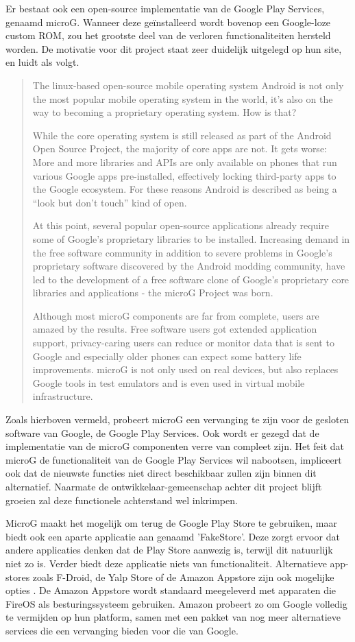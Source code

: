 Er bestaat ook een open-source implementatie van de Google Play Services, genaamd microG. Wanneer deze geïnstalleerd wordt bovenop een Google-loze custom ROM, zou het grootste deel van de verloren functionaliteiten hersteld worden. De motivatie voor dit project staat zeer duidelijk uitgelegd op hun site, en luidt als volgt. \blockcquote{microg}{
    The linux-based open-source mobile operating system Android is not only the most popular mobile operating system in the world, it’s also on the way to becoming a proprietary operating system. How is that?
    
    While the core operating system is still released as part of the Android Open Source Project, the majority of core apps are not. It gets worse: More and more libraries and APIs are only available on phones that run various Google apps pre-installed, effectively locking third-party apps to the Google ecosystem. For these reasons Android is described as being a “look but don’t touch” kind of open.
    
    At this point, several popular open-source applications already require some of Google’s proprietary libraries to be installed. Increasing demand in the free software community in addition to severe problems in Google’s proprietary software discovered by the Android modding community, have led to the development of a free software clone of Google’s proprietary core libraries and applications - the microG Project was born.
    
    Although most microG components are far from complete, users are amazed by the results. Free software users got extended application support, privacy-caring users can reduce or monitor data that is sent to Google and especially older phones can expect some battery life improvements. microG is not only used on real devices, but also replaces Google tools in test emulators and is even used in virtual mobile infrastructure.
}
Zoals hierboven vermeld, probeert microG een vervanging te zijn voor de gesloten software van Google, de Google Play Services. Ook wordt er gezegd dat de implementatie van de microG componenten verre van compleet zijn. Het feit dat microG de functionaliteit van de Google Play Services wil nabootsen, impliceert ook dat de nieuwste functies niet direct beschikbaar zullen zijn binnen dit alternatief. Naarmate de ontwikkelaar-gemeenschap achter dit project blijft groeien zal deze functionele achterstand wel inkrimpen.

MicroG maakt het mogelijk om terug de Google Play Store te gebruiken, maar biedt ook een aparte applicatie aan genaamd 'FakeStore'. Deze zorgt ervoor dat andere applicaties denken dat de Play Store aanwezig is, terwijl dit natuurlijk niet zo is. Verder biedt deze applicatie niets van functionaliteit. Alternatieve app-stores zoals F-Droid, de Yalp Store of de Amazon Appstore zijn ook mogelijke opties \autocite{shadow53_play-store}. De Amazon Appstore wordt standaard meegeleverd met apparaten die FireOS als besturingssysteem gebruiken. Amazon probeert zo om Google volledig te vermijden op hun platform, samen met een pakket van nog meer alternatieve services die een vervanging bieden voor die van Google.

